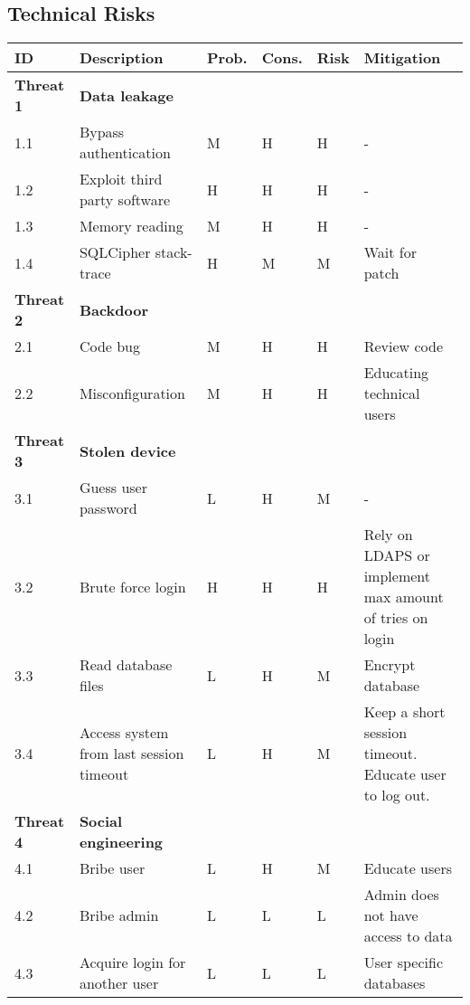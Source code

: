 

\subsection{Technical Risks}
\label{technicalrisks}
\begin{table}[H]
\renewcommand{\arraystretch}{1.2}
\begin{tabular}{|m{1.8cm}|m{3cm}|m{1cm}|m{1cm}|m{1cm}|m{4cm}|}
\hline
\textbf{ID} & \textbf{Description} & \textbf{Prob.} & \textbf{Cons.} & \textbf{Risk} & \textbf{Mitigation} \\ \hline
\textbf{Threat 1} & \textbf{Data leakage} &  &  &  &  \\ \hline
1.1 & Bypass authentication & M & H & H & - \\ \hline
1.2 & Exploit third party software & H & H & H & - \\ \hline
1.3 & Memory reading & M & H & H & - \\ \hline
1.4 & SQLCipher stack-trace & H & M & M & Wait for patch \\ \hline
\textbf{Threat 2} & \textbf{Backdoor} &  &  &  &  \\ \hline
2.1 & Code bug & M & H & H & Review code \\ \hline
2.2 & Misconfiguration & M & H & H & Educating technical users \\ \hline
\textbf{Threat 3} & \textbf{Stolen device} &  &  &  &  \\ \hline
3.1 & Guess user password & L & H & M & - \\ \hline
3.2 & Brute force login & H & H & H & Rely on LDAPS or implement max amount of tries on login \\ \hline
3.3 & Read database files & L & H & M & Encrypt database \\ \hline
3.4 & Access system from last session timeout & L & H & M & Keep a short session timeout. Educate user to log out. \\ \hline
\textbf{Threat 4} & \textbf{Social engineering} &  &  &  &  \\ \hline
4.1 & Bribe user & L & H & M & Educate users \\ \hline
4.2 & Bribe admin & L & L & L & Admin does not have access to data \\ \hline
4.3 & Acquire login for another user & L & L & L & User specific databases \\ \hline
\end{tabular}
\end{table}



